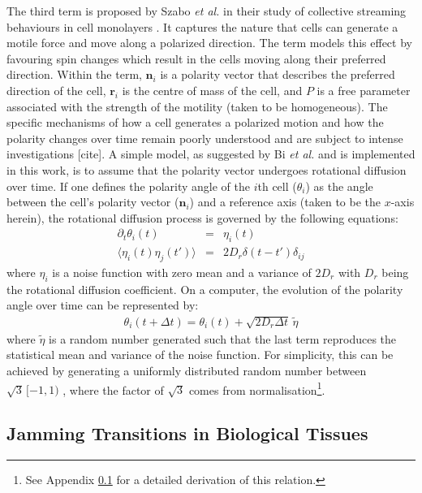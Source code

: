 \documentclass[a4paper,12pt]{article}
\begin{document}
The third term is proposed by Szabo \emph{et al.} in their study of collective streaming behaviours in cell monolayers \cite{szabo2010}. It captures the nature that cells can generate a motile force and move along a polarized direction. The term models this effect by favouring spin changes which result in the cells moving along their preferred direction. Within the term, $\bm{n}_i$ is a polarity vector that describes the preferred direction of the cell, $\bm{r}_i$ is the centre of mass of the cell, and $P$ is a free parameter associated with the strength of the motility (taken to be homogeneous). The specific mechanisms of how a cell generates a polarized motion and how the polarity changes over time remain poorly understood and are subject to intense investigations [cite]. A simple model, as suggested by Bi \emph{et al.} \cite{bi2015motility} and is implemented in this work, is to assume that the polarity vector undergoes rotational diffusion over time. If one defines the polarity angle of the $i$th cell ($\theta_i$) as the angle between the cell's polarity vector ($\bm{n}_i$) and a reference axis (taken to be the $x$-axis herein), the rotational diffusion process is governed by the following equations:
\begin{eqnarray}
\partial_t\theta_i(t) & = & \eta_i(t)\\
\langle{\eta_i(t)\eta_j(t')\rangle} & = & 2D_r\delta(t-t')\delta_{ij}
\end{eqnarray}
where $\eta_i$ is a noise function with zero mean and a variance of $2D_r$ with $D_r$ being the rotational diffusion coefficient. On a computer, the evolution of the polarity angle over time can be represented by:
\begin{eqnarray}
\label{eqn:computerRotateDiff}
\theta_i(t+\Delta t) = \theta_i(t) + \sqrt{2D_r\Delta t}\,\tilde\eta
\end{eqnarray}
where $\tilde\eta$ is a random number generated such that the last term reproduces the statistical mean and variance of the noise function. For simplicity, this can be achieved by generating a uniformly distributed random number between $\sqrt{3}\,[-1,1)$ , where the factor of $\sqrt{3}$ comes from normalisation\footnote{See Appendix \ref{} for a detailed derivation of this relation.}.

\subsection{Jamming Transitions in Biological Tissues}
\end{document}
